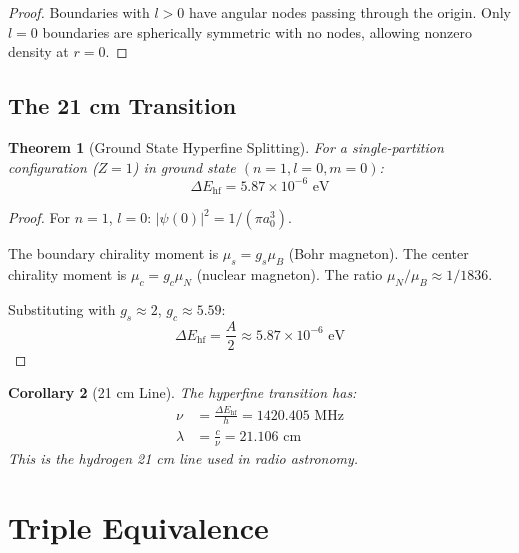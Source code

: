 \documentclass[twocolumn,10pt,a4paper]{article}
\newtheorem{theorem}{Theorem}[section]
\newtheorem{corollary}[theorem]{Corollary}
\theoremstyle{definition}
\theoremstyle{remark}
\begin{document}
\begin{proof}
Boundaries with $l > 0$ have angular nodes passing through the origin. Only $l = 0$ boundaries are spherically symmetric with no nodes, allowing nonzero density at $r = 0$.
\end{proof}

\subsection{The 21 cm Transition}

\begin{theorem}[Ground State Hyperfine Splitting]
\label{thm:21cm}
For a single-partition configuration ($Z = 1$) in ground state $(n=1, l=0, m=0)$:
\begin{equation}
    \Delta E_{\text{hf}} = 5.87 \times 10^{-6} \text{ eV}
\end{equation}
\end{theorem}

\begin{proof}
For $n = 1$, $l = 0$: $|\psi(0)|^2 = 1/(\pi a_0^3)$.

The boundary chirality moment is $\mu_s = g_s \mu_B$ (Bohr magneton).
The center chirality moment is $\mu_c = g_c \mu_N$ (nuclear magneton).
The ratio $\mu_N/\mu_B \approx 1/1836$.

Substituting with $g_s \approx 2$, $g_c \approx 5.59$:
\begin{equation}
    \Delta E_{\text{hf}} = \frac{A}{2} \approx 5.87 \times 10^{-6} \text{ eV}
\end{equation}
\end{proof}

\begin{corollary}[21 cm Line]
The hyperfine transition has:
\begin{align}
    \nu &= \frac{\Delta E_{\text{hf}}}{h} = 1420.405 \text{ MHz} \\
    \lambda &= \frac{c}{\nu} = 21.106 \text{ cm}
\end{align}
This is the hydrogen 21 cm line used in radio astronomy.
\end{corollary}

\section{Triple Equivalence}
\label{sec:triple}
\end{document}
